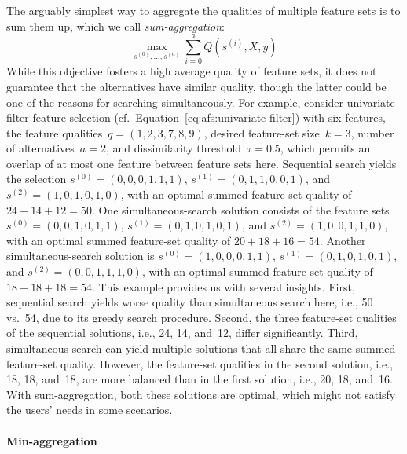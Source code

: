 \documentclass{article}
\theoremstyle{definition}
\begin{document}
The arguably simplest way to aggregate the qualities of multiple feature sets is to sum them up, which we call \emph{sum-aggregation}:
%
\begin{equation}
	\max_{s^{(0)}, \dots, s^{(a)}} \sum_{i=0}^a Q(s^{(i)},X,y)
	\label{eq:afs:afs-simultaneous-sum-objective}
\end{equation}
%
While this objective fosters a high average quality of feature sets, it does not guarantee that the alternatives have similar quality, though the latter could be one of the reasons for searching simultaneously.
For example, consider univariate filter feature selection (cf.~Equation~\ref{eq:afs:univariate-filter}) with six features, the feature qualities~$q = (1,2,3,7,8,9)$, desired feature-set size~$k=3$, number of alternatives~$a=2$, and dissimilarity threshold~$\tau = 0.5$, which permits an overlap of at most one feature between feature sets here.
Sequential search yields the selection $s^{(0)} = (0,0,0,1,1,1)$, $s^{(1)} = (0,1,1,0,0,1)$, and $s^{(2)} = (1,0,1,0,1,0)$, with an optimal summed feature-set quality of $24+14+12=50$.
One simultaneous-search solution consists of the feature sets $s^{(0)} = (0,0,1,0,1,1)$, $s^{(1)} = (0,1,0,1,0,1)$, and $s^{(2)} = (1,0,0,1,1,0)$, with an optimal summed feature-set quality of $20+18+16=54$.
Another simultaneous-search solution is $s^{(0)} = (1,0,0,0,1,1)$, $s^{(1)} = (0,1,0,1,0,1)$, and $s^{(2)} = (0,0,1,1,1,0)$, with an optimal summed feature-set quality of $18+18+18=54$.
This example provides us with several insights.
First, sequential search yields worse quality than simultaneous search here, i.e., 50 vs.~54, due to its greedy search procedure.
Second, the three feature-set qualities of the sequential solutions, i.e., 24, 14, and~12, differ significantly.
Third, simultaneous search can yield multiple solutions that all share the same summed feature-set quality.
However, the feature-set qualities in the second solution, i.e., 18, 18, and~18, are more balanced than in the first solution, i.e., 20, 18, and~16.
With sum-aggregation, both these solutions are optimal, which might not satisfy the users' needs in some scenarios.

\paragraph{Min-aggregation}
\end{document}
